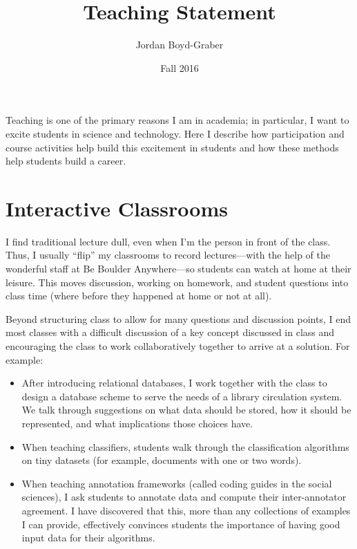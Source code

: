 \documentclass[11pt]{amsart}
\begin{document}
 \title{Teaching Statement}

 \author{Jordan Boyd-Graber}
\address{University of Colorado}

\date{Fall 2016}


\keywords{}

\maketitle

Teaching is one of the primary reasons I am in academia; in particular, I want
to excite students in science and technology. Here I describe how
participation and course activities help build this excitement in students and
how these methods help students build a career.

\section{Interactive Classrooms}

I find traditional lecture dull, even when I'm the person in front of
the class.  Thus, I usually ``flip'' my classrooms to record
lectures---with the help of the wonderful staff at Be Boulder
Anywhere---so students can watch at home at their leisure.  This moves
discussion, working on homework, and student questions into class time
(where before they happened at home or not at all).

Beyond structuring class to allow for many questions and discussion
points, I end most classes with a difficult discussion of a key
concept discussed in class and encouraging the class to work
collaboratively together to arrive at a solution.  For example:
\begin{itemize}
  \item After introducing relational databases, I work together with the class to
design a database scheme to serve the needs of a library circulation
system.  We talk through suggestions on what data should be stored,
how it should be represented, and what implications those choices
have.
  \item When teaching classifiers, students walk through the classification
    algorithms on tiny datasets (for example, documents with one or two words).
  \item When teaching annotation frameworks (called coding guides in the
    social sciences), I ask students to annotate data and
    compute their inter-annotator agreement.  I have discovered that this, more
    than any collections of examples I can provide, effectively convinces
    students the importance of having good input data for their algorithms.
\end{itemize}
\end{document}
